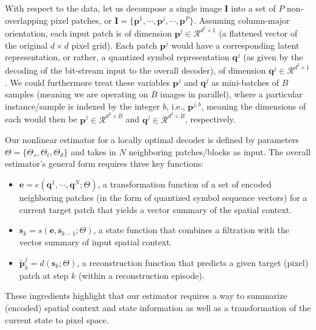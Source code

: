\documentclass[smallabstract,smallcaptions]{dccpaper}
\begin{document}
With respect to the data, let us decompose a single image $\mathbf{I}$ into a set of $P$ non-overlapping pixel patches, or $\mathbf{I} = \{ \mathbf{p}^1,\cdots,\mathbf{p}^j,\cdots,\mathbf{p}^P \}$. Assuming column-major orientation, each input patch is of dimension $\mathbf{p}^j \in \mathcal{R}^{d^2 \times 1}$ (a flattened vector of the original $d \times d$ pixel grid). Each patch $\mathbf{p}^j$ would have a corresponding latent representation, or rather, a quantized symbol representation $\mathbf{q}^j$ (as given by the decoding of the bit-stream input to the overall decoder), of dimension $\mathbf{q}^j \in \mathcal{R}^{d^2 \times 1}$. We could furthermore treat these variables $\mathbf{p}^j$ and $\mathbf{q}^j$ as mini-batches of $B$ samples (meaning we are operating on $B$ images in parallel), where a particular instance/sample is indexed by the integer $b$, i.e., $\mathbf{p}^{j,b}$, meaning the dimensions of each would then be $\mathbf{p}^j \in \mathcal{R}^{d^2 \times B}$ and $\mathbf{q}^j \in \mathcal{R}^{d^2 \times B}$, respectively.

Our nonlinear estimator for a locally optimal decoder is defined by parameters $\Theta = \{\Theta_s, \Theta_t, \Theta_d\}$ and takes in $N$ neighboring patches/blocks as input. The overall estimator's general form requires three key functions: 
\begin{itemize}[noitemsep] %
\item $\mathbf{e} = e(\mathbf{q}^1, \cdots, \mathbf{q}^N ; \Theta)$, a transformation function of a set of encoded neighboring patches (in the form of quantized symbol sequence vectors) for a current target patch that yields a vector summary of the spatial context.
\item $\mathbf{s}_k = s(\mathbf{e}, \mathbf{s}_{k-1} ; \Theta)$, a state function that combines a filtration with the vector summary of input spatial context.
\item $\widetilde{\mathbf{p}}^j_k = d(\mathbf{s}_k ; \Theta)$, a reconstruction function that predicts a given target (pixel) patch at step $k$ (within a reconstruction episode).
\end{itemize}
These ingredients highlight that our estimator requires a way to summarize (encoded) spatial context and state information as well as a transformation of the current state to pixel space. %
\end{document}
